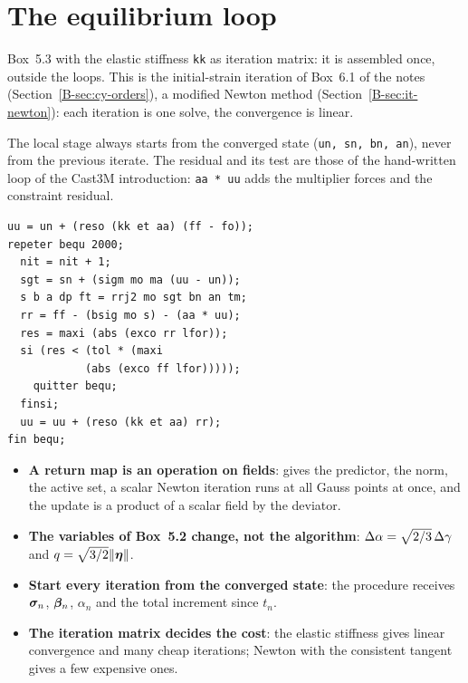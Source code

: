 \section{The equilibrium loop}\label{cc:sec5-loop}
%
\begin{castemcom}
Box~5.3 with the elastic stiffness \texttt{kk} as iteration matrix: it is
assembled once, outside the loops. This is the initial-strain iteration of
Box~6.1 of the notes (Section~\ref{B-sec:cy-orders}), a modified Newton
method (Section~\ref{B-sec:it-newton}): each iteration is one solve, the
convergence is linear.

The local stage always starts from the converged state
(\texttt{un, sn, bn, an}), never from the previous iterate. The residual and
its test are those of the hand-written loop of the Cast3M introduction:
\texttt{aa * uu} adds the multiplier forces and the constraint residual.
\end{castemcom}
\begin{castemlines}
\begin{verbatim}
uu = un + (reso (kk et aa) (ff - fo));
repeter bequ 2000;
  nit = nit + 1;
  sgt = sn + (sigm mo ma (uu - un));
  s b a dp ft = rrj2 mo sgt bn an tm;
  rr = ff - (bsig mo s) - (aa * uu);
  res = maxi (abs (exco rr lfor));
  si (res < (tol * (maxi
            (abs (exco ff lfor)))));
    quitter bequ;
  finsi;
  uu = uu + (reso (kk et aa) rr);
fin bequ;
\end{verbatim}
\end{castemlines}


\begin{gbox*}
\begin{itemize}
\item \textbf{A return map is an operation on fields}:  gives the
  predictor,  the norm,  the active set, a scalar Newton
  iteration runs at all Gauss points at once, and the update is a product of
  a scalar field by the deviator.
\item \textbf{The variables of Box~5.2 change, not the algorithm}:
  $\Delta\alpha=\sqrt{2/3}\,\Delta\gamma$ and $q=\sqrt{3/2}\lVert \bm{\eta}\rVert$.
\item \textbf{Start every iteration from the converged state}: the
  procedure receives $\bm{\sigma}_n$, $\bm{\beta}_n$, $\alpha_n$ and the total increment
  since $t_n$.
\item \textbf{The iteration matrix decides the cost}: the elastic stiffness
  gives linear convergence and many cheap iterations; Newton with the
  consistent tangent gives a few expensive ones.
\end{itemize}
\end{gbox*}

